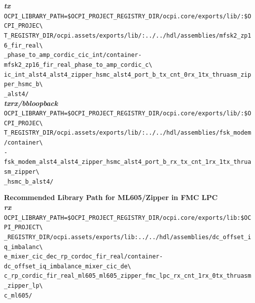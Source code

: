 \noindent\textbf{\textit{tx}}\\
\verb|OCPI_LIBRARY_PATH=$OCPI_PROJECT_REGISTRY_DIR/ocpi.core/exports/lib/:$OCPI_PROJEC\| \\
\verb|T_REGISTRY_DIR/ocpi.assets/exports/lib/:../../hdl/assemblies/mfsk2_zp16_fir_real\| \\
\verb|_phase_to_amp_cordic_cic_int/container-mfsk2_zp16_fir_real_phase_to_amp_cordic_c\| \\
\verb|ic_int_alst4_alst4_zipper_hsmc_alst4_port_b_tx_cnt_0rx_1tx_thruasm_zipper_hsmc_b\| \\
\verb|_alst4/| \\

\noindent\textbf{\textit{txrx/bbloopback}}\\
\verb|OCPI_LIBRARY_PATH=$OCPI_PROJECT_REGISTRY_DIR/ocpi.core/exports/lib/:$OCPI_PROJEC\| \\
\verb|T_REGISTRY_DIR/ocpi.assets/exports/lib/:../../hdl/assemblies/fsk_modem/container\| \\
\verb|-fsk_modem_alst4_alst4_zipper_hsmc_alst4_port_b_rx_tx_cnt_1rx_1tx_thruasm_zipper\| \\
\verb|_hsmc_b_alst4/| \\
\par\medskip
\pagebreak

\noindent\textbf{Recommended Library Path for ML605/Zipper in FMC LPC}\\

\noindent\textbf{\textit{rx}}\\
\verb|OCPI_LIBRARY_PATH=$OCPI_PROJECT_REGISTRY_DIR/ocpi.core/exports/lib:$OCPI_PROJECT\| \\
\verb|_REGISTRY_DIR/ocpi.assets/exports/lib:../../hdl/assemblies/dc_offset_iq_imbalanc\| \\
\verb|e_mixer_cic_dec_rp_cordoc_fir_real/container-dc_offset_iq_imbalance_mixer_cic_de\| \\
\verb|c_rp_cordic_fir_real_ml605_ml605_zipper_fmc_lpc_rx_cnt_1rx_0tx_thruasm_zipper_lp\| \\
\verb|c_ml605/|\\


